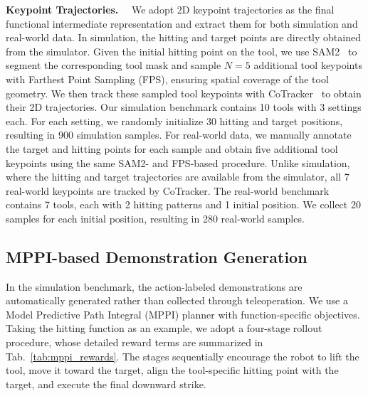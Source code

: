 \textbf{Keypoint Trajectories.}~~
We adopt 2D keypoint trajectories as the final functional intermediate representation and extract them for both simulation and real-world data. In simulation, the hitting and target points are directly obtained from the simulator. Given the initial hitting point on the tool, we use SAM2~\citep{ravi2025sam} to segment the corresponding tool mask and sample $N=5$ additional tool keypoints with Farthest Point Sampling (FPS), ensuring spatial coverage of the tool geometry. We then track these sampled tool keypoints with CoTracker~\citep{karaev2024cotracker} to obtain their 2D trajectories. Our simulation benchmark contains 10 tools with 3 settings each. For each setting, we randomly initialize 30 hitting and target positions, resulting in 900 simulation samples.
For real-world data, we manually annotate the target and hitting points for each sample and obtain five additional tool keypoints using the same SAM2- and FPS-based procedure. Unlike simulation, where the hitting and target trajectories are available from the simulator, all 7 real-world keypoints are tracked by CoTracker. The real-world benchmark contains 7 tools, each with 2 hitting patterns
and 1 initial position. We collect 20 samples for each initial position, resulting in 280 real-world samples. 



\subsection{MPPI-based Demonstration Generation}
\label{app:mppi_annotation}

In the simulation benchmark, the action-labeled demonstrations are automatically generated rather than collected through teleoperation.
We use a Model Predictive Path Integral (MPPI) planner with function-specific objectives.
Taking the hitting function as an example, we adopt a four-stage rollout procedure, whose detailed reward terms are summarized in Tab.~\ref{tab:mppi_rewards}.
The stages sequentially encourage the robot to lift the tool, move it toward the target, align the tool-specific hitting point with the target, and execute the final downward strike.

